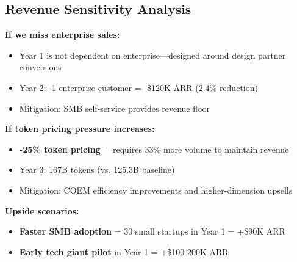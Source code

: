 \subsection{Revenue Sensitivity Analysis}

\textbf{If we miss enterprise sales:}
\begin{itemize}[noitemsep]
    \item Year 1 is not dependent on enterprise—designed around design partner conversions
    \item Year 2: -1 enterprise customer = -\$120K ARR (2.4\% reduction)
    \item Mitigation: SMB self-service provides revenue floor
\end{itemize}

\textbf{If token pricing pressure increases:}
\begin{itemize}[noitemsep]
    \item \textbf{-25\% token pricing} = requires 33\% more volume to maintain revenue
    \item Year 3: 167B tokens (vs. 125.3B baseline)
    \item Mitigation: COEM efficiency improvements and higher-dimension upsells
\end{itemize}

\textbf{Upside scenarios:}
\begin{itemize}[noitemsep]
    \item \textbf{Faster SMB adoption} = 30 small startups in Year 1 = +\$90K ARR
    \item \textbf{Early tech giant pilot} in Year 1 = +\$100-200K ARR
\end{itemize}

